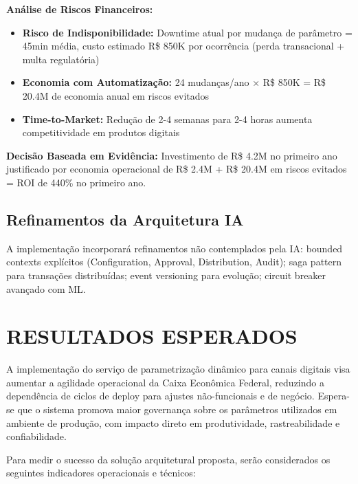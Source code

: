 \textbf{Análise de Riscos Financeiros:}
\begin{itemize}
\item \textbf{Risco de Indisponibilidade:} Downtime atual por mudança de parâmetro = 45min média, custo estimado R\$ 850K por ocorrência (perda transacional + multa regulatória)
\item \textbf{Economia com Automatização:} 24 mudanças/ano × R\$ 850K = R\$ 20.4M de economia anual em riscos evitados
\item \textbf{Time-to-Market:} Redução de 2-4 semanas para 2-4 horas aumenta competitividade em produtos digitais
\end{itemize}

\textbf{Decisão Baseada em Evidência:} Investimento de R\$ 4.2M no primeiro ano justificado por economia operacional de R\$ 2.4M + R\$ 20.4M em riscos evitados = ROI de 440\% no primeiro ano.

\section{Refinamentos da Arquitetura IA}

A implementação incorporará refinamentos não contemplados pela IA: bounded contexts explícitos (Configuration, Approval, Distribution, Audit); saga pattern para transações distribuídas; event versioning para evolução; circuit breaker avançado com ML.

\chapter{RESULTADOS ESPERADOS}

A implementação do serviço de parametrização dinâmico para canais digitais visa aumentar a agilidade operacional da Caixa Econômica Federal, reduzindo a dependência de ciclos de deploy para ajustes não-funcionais e de negócio. Espera-se que o sistema promova maior governança sobre os parâmetros utilizados em ambiente de produção, com impacto direto em produtividade, rastreabilidade e confiabilidade.

Para medir o sucesso da solução arquitetural proposta, serão considerados os seguintes indicadores operacionais e técnicos:

